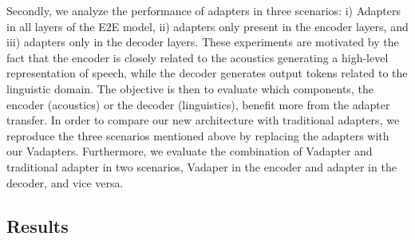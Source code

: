 Secondly, we analyze the performance of adapters in three scenarios: i) Adapters in all layers of the E2E model, ii) adapters only  present in the encoder layers, and iii) adapters only in the decoder layers. These experiments are motivated by the fact that the encoder is closely related to the acoustics generating a high-level representation of speech, while the decoder generates output tokens related to the linguistic domain. The objective is then to evaluate which components, the encoder  (acoustics) or the decoder (linguistics), benefit more from the adapter transfer.
In order to compare our new architecture with traditional adapters, we reproduce the three scenarios mentioned above by replacing the adapters with our Vadapters. Furthermore,  we evaluate the combination of Vadapter and traditional adapter in two scenarios, Vadaper in the encoder and adapter in the decoder, and vice versa.

\subsection{Results}
\label{section:exp}

